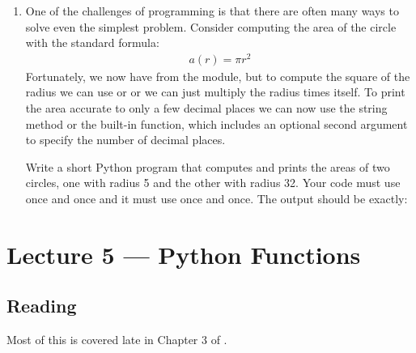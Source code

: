 \documentclass[letterpaper,10pt,english]{sphinxmanual}
\begin{document}
\begin{enumerate}
\item {} 
One of the challenges of programming is that there are often many
ways to solve even the simplest problem.  Consider computing the
area of the circle with the standard formula:
\begin{equation*}
\begin{split}a(r) = \pi r^2\end{split}
\end{equation*}
Fortunately, we now have  from the  module, but to
compute the square of the radius we can use \sphinxcode{\sphinxupquote{**}} or
 or we can just multiply the radius times itself. To
print the area accurate to only a few decimal places we can now use
the string  method or the  built-in
function, which includes an optional second argument to specify the
number of decimal places.

Write a short Python program that computes and prints the areas of
two circles, one with radius 5 and the other with radius 32. Your
code must use \sphinxcode{\sphinxupquote{**}} once and  once and it must use
 once and  once.  The output should be
exactly:

\begin{sphinxVerbatim}[commandchars=\\\{\}]
   
   
\end{sphinxVerbatim}

\end{enumerate}


\chapter{Lecture 5 — Python Functions}
\label{\detokenize{lecture_notes/lec05_functions2:lecture-5-python-functions}}\label{\detokenize{lecture_notes/lec05_functions2::doc}}

\section{Reading}
\label{\detokenize{lecture_notes/lec05_functions2:reading}}
Most of this is covered late in Chapter 3 of .
\end{document}
